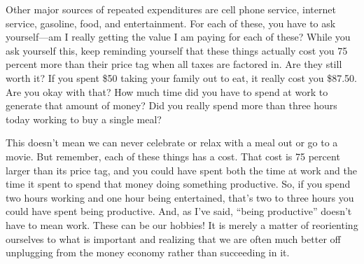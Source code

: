 Other major sources of repeated expenditures are cell phone service,
internet service, gasoline, food, and entertainment. For each of these,
you have to ask yourself—am I really getting the value I am paying for
each of these? While you ask yourself this, keep reminding yourself
that these things actually cost you 75 percent more than their price
tag when all taxes are factored in. Are they still worth it? If you
spent \$50 taking your family out to eat, it really cost you \$87.50.
Are you okay with that? How much time did you have to spend at work to
generate that amount of money? Did you really spend more than three
hours today working to buy a single meal?

This doesn’t mean we can never celebrate or relax with a meal out or go
to a movie. But remember, each of these things has a cost. That cost is
75 percent larger than its price tag, and you could have spent both the
time at work and the time it spent to spend that money doing something
productive. So, if you spend two hours working and one hour being
entertained, that’s two to three hours you could have spent being
productive. And, as I’ve said, “being productive” doesn’t have to mean
work. These can be our hobbies!  It is merely a matter of reorienting
ourselves to what is important and realizing that we are often much
better off unplugging from the money economy rather than succeeding in
it.

